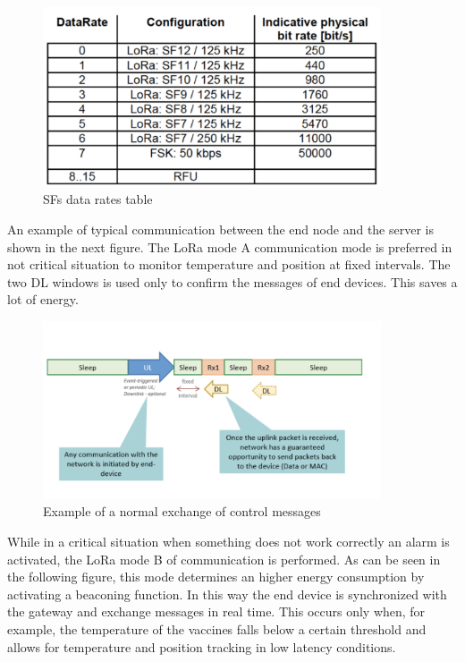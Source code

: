\documentclass[12pt]{report}
\begin{document}
\begin{figure}[h!]
    \centering
    \includegraphics[width=10cm]{Pictures/SF data rates.png}
    \caption{SFs data rates table}
\end{figure}


An example of typical communication between the end node and the server is shown in the next figure. The LoRa mode A communication mode is preferred in not critical situation to monitor temperature and position at fixed intervals. The two DL windows is used only to confirm the messages of end devices. This saves a lot of energy.

\begin{figure}[h!]
    \centering
    \includegraphics[width=10cm]{Pictures/Class A devices .png}
    \caption{Example of a normal exchange of control messages}
\end{figure}


While in a critical situation when something does not work correctly an alarm is activated, the LoRa mode B of communication is performed. As can be seen in the following figure, this mode determines an higher energy consumption by activating a beaconing function. In this way the end device is synchronized with the gateway and exchange messages in real time. This occurs only when, for example, the temperature of the vaccines falls below a certain threshold and allows for temperature and position tracking in low latency conditions.
\end{document}
